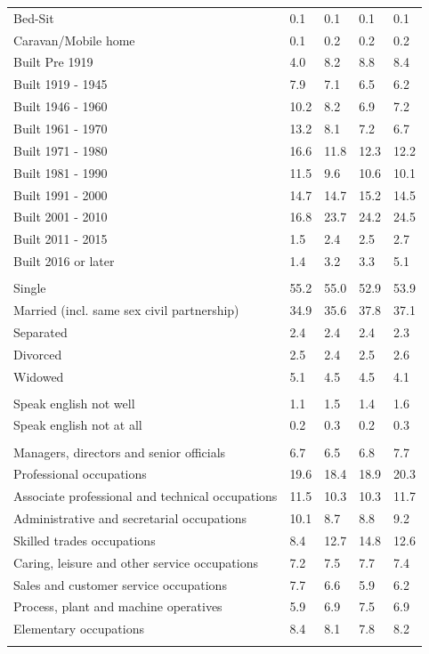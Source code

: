 \documentclass{article}
\begin{document}
\begin{table}[h]
\begin{tabular}{KTTTT}
Bed-Sit & 0.1& 0.1& 0.1& 0.1\\
Caravan/Mobile home & 0.1& 0.2& 0.2& 0.2\\
    \hline
Built Pre 1919 & 4.0& 8.2& 8.8& 8.4\\
Built 1919 - 1945 & 7.9& 7.1& 6.5& 6.2\\
Built  1946 - 1960 & 10.2&  8.2&  6.9&  7.2\\
Built  1961 - 1970 & 13.2&  8.1&  7.2&  6.7\\
Built  1971 - 1980 & 16.6& 11.8& 12.3& 12.2\\
Built  1981 - 1990 & 11.5&  9.6& 10.6& 10.1\\
Built  1991 - 2000 & 14.7& 14.7& 15.2& 14.5\\
Built  2001 - 2010 & 16.8& 23.7& 24.2& 24.5\\
Built  2011 - 2015 & 1.5& 2.4& 2.5& 2.7\\
Built  2016 or later & 1.4& 3.2& 3.3& 5.1\\
\hline
    \\
    \hline
Single & 55.2& 55.0& 52.9& 53.9\\
Married (incl. same sex civil partnership) & 34.9& 35.6& 37.8& 37.1\\
Separated  & 2.4& 2.4& 2.4& 2.3\\
Divorced  & 2.5& 2.4& 2.5& 2.6\\
Widowed & 5.1& 4.5& 4.5& 4.1\\
\hline
    \\ 
    \hline
Speak english not well & 1.1& 1.5& 1.4& 1.6\\
Speak english not at all & 0.2& 0.3& 0.2& 0.3\\
\hline
    \\
    \hline
Managers, directors and senior officials & 6.7& 6.5& 6.8& 7.7\\
Professional occupations & 19.6& 18.4& 18.9& 20.3\\
Associate professional and technical occupations & 11.5& 10.3& 10.3& 11.7\\
Administrative and secretarial occupations & 10.1&  8.7&  8.8&  9.2\\
Skilled trades occupations &  8.4& 12.7& 14.8& 12.6\\
Caring, leisure and other service occupations & 7.2& 7.5& 7.7& 7.4\\
Sales and customer service occupations & 7.7& 6.6& 5.9& 6.2\\
Process, plant and machine operatives & 5.9& 6.9& 7.5& 6.9\\
Elementary occupations & 8.4& 8.1& 7.8& 8.2\\
\hline
\end{tabular}
\end{table}
\end{document}
